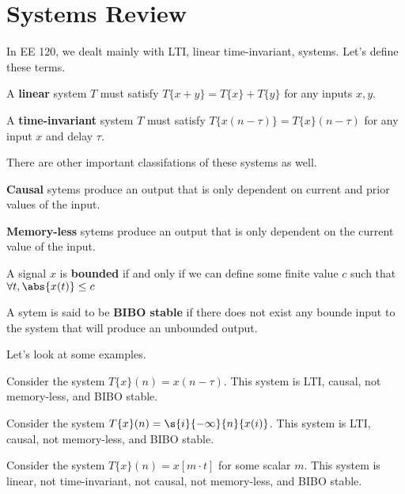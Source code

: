 \documentclass{report}
\begin{document}
\section{Systems Review}
In EE 120, we dealt mainly with LTI, linear time-invariant, systems. Let's define these terms.

\theoremstyle{definition}
\begin{definition}
    A \textbf{linear} system $T$ must satisfy $T\{x + y\} = T\{x\} + T\{y\}$ for any inputs $x, y$.
\end{definition}

\begin{definition}
    A \textbf{time-invariant} system $T$ must satisfy $T\{x(n - \tau)\} = T\{x\}(n - \tau)$ for any input $x$ and delay $\tau$.
\end{definition}

There are other important classifations of these systems as well.

\begin{definition}
    \textbf{Causal} sytems produce an output that is only dependent on current and prior values of the input.
\end{definition}
\begin{definition}
    \textbf{Memory-less} sytems produce an output that is only dependent on the current value of the input.
\end{definition}
\begin{definition}
    A signal $x$ is \textbf{bounded} if and only if we can define some finite value $c$ such that $\forall t, \abs{x(t)} \leq c$
\end{definition}
\begin{definition}
    A sytem is said to be \textbf{BIBO stable} if there does not exist any bounde input to the system that will produce an unbounded output.
\end{definition}

Let's look at some examples.

\begin{example}
    Consider the system $T\{x\}(n) = x(n - \tau)$. This system is LTI, causal, not memory-less, and BIBO stable.
\end{example}

\begin{example}
    Consider the system $T\{x\}(n) = \s{i}{-\infty}{n}{x(i)}$. This system is LTI, causal, not memory-less, and BIBO stable.
\end{example}

\begin{example}
    Consider the system $T\{x\}(n) = x[m \cdot t]$ for some scalar $m$. This system is linear, not time-invariant, not causal, not memory-less, and BIBO stable.
\end{example}
\end{document}
